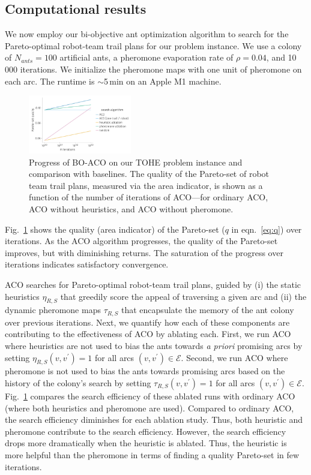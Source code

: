 \documentclass[11pt, oneside]{article}
\begin{document}
\subsection{Computational results}
We now employ our bi-objective ant optimization algorithm to search for the Pareto-optimal robot-team trail plans for our problem instance.
We use a colony of $N_{ants}=100$ artificial ants, a pheromone evaporation rate of $\rho=0.04$, and 10\,000 iterations. We initialize the pheromone maps with one unit of pheromone on each arc.
The runtime is $\sim$5\,min on an Apple M1 machine.

\begin{figure}[h!]
    \centering
    \includegraphics[width=0.4\textwidth]{ACO_comparison.pdf}
    \caption{Progress of BO-ACO on our TOHE problem instance and comparison with baselines. 
    The quality of the Pareto-set of robot team trail plans, measured via the area indicator, is shown as a function of the number of iterations of ACO---for ordinary ACO, ACO without heuristics, and ACO without pheromone.
    } \label{fig:aco_progress}
\end{figure}

Fig.~\ref{fig:aco_progress} shows the quality (area indicator) of the Pareto-set ($q$ in eqn.~\ref{eq:q}) over iterations. As the ACO algorithm progresses, the quality of the Pareto-set improves, but with diminishing returns. The saturation of the progress over iterations indicates satisfactory convergence.

ACO searches for Pareto-optimal robot-team trail plans,
guided by (i) the static heuristics $\eta_{R,S}$ that greedily score the appeal of traversing a given arc and (ii) the dynamic pheromone maps $\tau_{R,S}$ that encapsulate the memory of the ant colony over previous iterations. 
Next, we quantify how each of these components are contributing to the effectiveness of ACO by ablating each. 
First, we run ACO where heuristics are not used to bias the ants towards \emph{a priori} promising arcs by setting $\eta_{R,S}(v, v^\prime)=1$ for all arcs $(v, v^\prime)\in \mathcal{E}$. Second, we run ACO where pheromone is not used to bias the ants towards promising arcs based on the history of the colony's search by setting $\tau_{R,S}(v, v^\prime)=1$ for all arcs $(v, v^\prime)\in \mathcal{E}$.
Fig.~\ref{fig:aco_progress} compares the search efficiency of these ablated runs with ordinary ACO (where both heuristics and pheromone are used).
Compared to ordinary ACO, the search efficiency diminishes for each ablation study. 
Thus, both heuristic and pheromone contribute to the search efficiency.
However, the search efficiency drops more dramatically when the heuristic is ablated. 
Thus, the heuristic is more helpful than the pheromone in terms of finding a quality Pareto-set in few iterations. 
\end{document}
